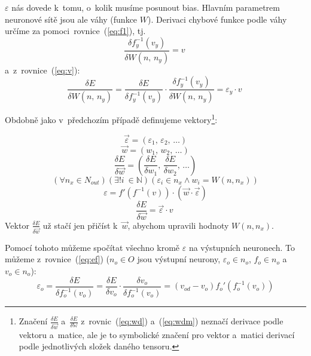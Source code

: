 \documentclass[12pt]{report}			%
\newcommand{\N}{\mathbb{N}}   			%
\newcommand{\W}{\mathbb{W}}
\begin{document}
					$\varepsilon$ nás dovede k~tomu, o~kolik musíme posunout bias. Hlavním parametrem neuronové sítě jsou ale váhy (funkce $W$). Derivaci chybové funkce podle váhy určíme za pomoci~rovnice~(\ref{eq:f1}), tj.
					\begin{equation} \frac{\delta f_y^{-1}(v_y)}{\delta W\left(n,\,n_y\right)} = v~\end{equation}
					a~z~rovnice~(\ref{eq:v}):
					\begin{equation} \frac{\delta E}{\delta W\left(n,\,n_y\right)} = \frac{\delta E}{\delta f_y^{-1}\left(v_y\right)}\cdot\frac{\delta f_y^{-1}\left(v_y\right)}{\delta W\left(n,\,n_y\right)} = \varepsilon_y \cdot v~\end{equation}
				
					Obdobně jako v~předchozím případě definujeme vektory\footnote{Značení $\frac{\delta E}{\delta\vec{w}}$ a~$\frac{\delta E}{\delta\W}$ z~rovnic~(\ref{eq:wd}) a~(\ref{eq:wdm}) neznačí derivace podle vektoru a~matice, ale je to symbolické značení pro vektor a~matici derivací podle jednotlivých složek daného tensoru.}:
					
					\begin{equation} \vec{\varepsilon} = \left(\varepsilon_{1},\,\varepsilon_{2},\,\ldots\right) \end{equation}
					\begin{equation} \vec{w} = \left(w_{1},\,w_{2},\,\ldots\right) \end{equation}
					\begin{equation} \frac{\delta E}{\delta\vec{w}} = \left(\frac{\delta E}{\delta w_{1}},\,\frac{\delta E}{\delta w_{2}},\,\ldots\right) \label{eq:wd} \end{equation}
					\begin{equation} \left(\forall n_x \in N_{out}\right)\left(\exists! i~\in \N\right)\left(\varepsilon_i \in n_x \land w_i = W\left(n, n_x\right)\right) \end{equation}
					\begin{equation} \varepsilon = f'\left(f^{-1}(v)\right)\cdot \left(\vec{w} \cdot \vec{\varepsilon}\right) \label{eq:bp1} \end{equation}
					\begin{equation} \frac{\delta E}{\delta\vec{w}} = \vec{\varepsilon}\cdot v~\label{eq:bp2} \end{equation}
					Vektor $\frac{\delta E}{\delta\vec{w}}$ už stačí jen přičíst k~$\vec{w}$, abychom upravili hodnoty $W\left(n, n_x\right)$.
					
					Pomocí tohoto můžeme spočítat všechno kromě $\varepsilon$ na výstupních neuronech. To můžeme z~rovnice~(\ref{eq:ef}) ($n_o \in O$ jsou výstupní neurony, $\varepsilon_o \in n_o$, $f_o \in n_o$ a~$v_o \in n_o$):
					\begin{equation} \varepsilon_o = \frac{\delta E}{\delta f_o^{-1}\left(v_o\right)} = \frac{\delta E}{\delta v_o} \cdot \frac{\delta v_o}{\delta f_o^{-1}\left(v_o\right)} = (v_{od} - v_o) f_o'\left(f_o^{-1}\left(v_o\right)\right) \label{eq:bpout} \end{equation}
					
\end{document}

